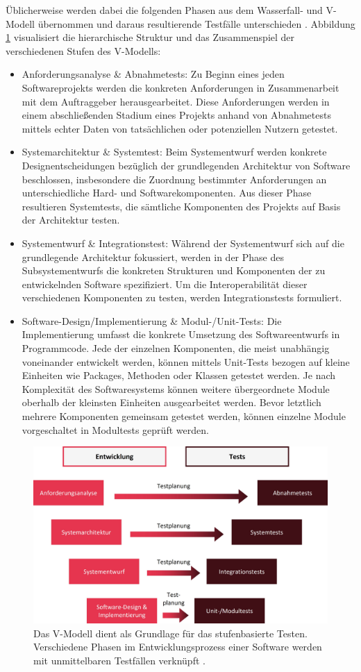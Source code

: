 Üblicherweise werden dabei die folgenden Phasen aus dem Wasserfall- und V-Modell übernommen und daraus resultierende Testfälle unterschieden \cite[S. 5 f.]{ammann2008introduction}. Abbildung \ref{fig:vmodell} visualisiert die hierarchische Struktur und das Zusammenspiel der verschiedenen Stufen des V-Modells:
\begin{itemize}
\item Anforderungsanalyse \& Abnahmetests: Zu Beginn eines jeden Softwareprojekts  werden die konkreten Anforderungen in Zusammenarbeit mit dem Auftraggeber herausgearbeitet. Diese Anforderungen werden in einem abschließenden Stadium eines Projekts anhand von Abnahmetests mittels echter Daten von tatsächlichen oder potenziellen Nutzern getestet.
\item Systemarchitektur \& Systemtest: Beim Systementwurf werden konkrete Designentscheidungen bezüglich der grundlegenden Architektur von Software beschlossen, insbesondere die Zuordnung bestimmter Anforderungen an unterschiedliche Hard- und Softwarekomponenten. Aus dieser Phase resultieren Systemtests, die sämtliche Komponenten des Projekts auf Basis der Architektur testen. 
\item Systementwurf \& Integrationstest: Während der Systementwurf sich auf die grundlegende Architektur fokussiert, werden in der Phase des Subsystementwurfs die konkreten Strukturen und Komponenten der zu entwickelnden Software spezifiziert. Um die Interoperabilität dieser verschiedenen Komponenten zu testen, werden Integrationstests formuliert.
\item Software-Design/Implementierung \& Modul-/Unit-Tests: Die Implementierung umfasst die konkrete Umsetzung des Softwareentwurfs in Programmcode. Jede der einzelnen Komponenten, die meist unabhängig voneinander entwickelt werden, können mittels Unit-Tests bezogen auf kleine Einheiten wie Packages, Methoden oder Klassen getestet werden. Je nach Komplexität des Softwaresystems können weitere übergeordnete Module oberhalb der kleinsten Einheiten ausgearbeitet werden. Bevor letztlich mehrere Komponenten gemeinsam getestet werden, können einzelne Module vorgeschaltet in Modultests geprüft werden.
\end{itemize}

\begin{figure}
\centering
\includegraphics[width=0.7\columnwidth]{images/V_Modell.jpg}
\caption{Das V-Modell dient als Grundlage für das stufenbasierte Testen. Verschiedene Phasen im Entwicklungsprozess einer Software werden mit unmittelbaren Testfällen verknüpft \cite[S. 101]{craig2002systematic}.}
\label{fig:vmodell}
\end{figure}


